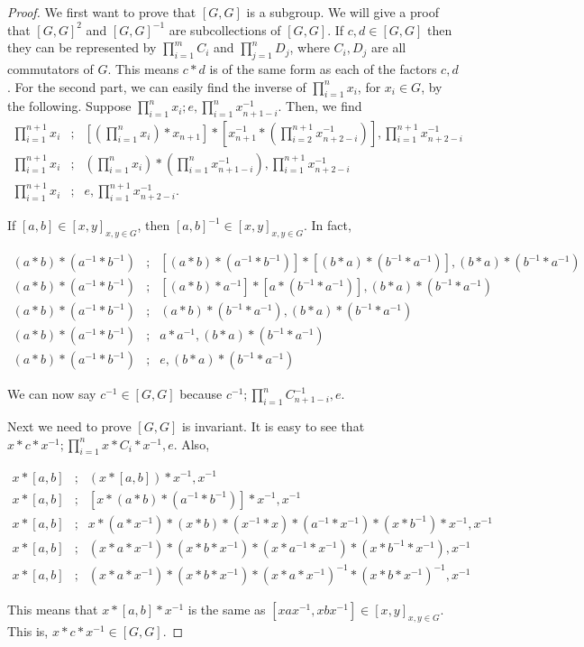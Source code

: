 \documentclass [12pt]{book}
\begin{document}
\begin{proof}We first want to prove that $[G,G]$ is a subgroup. We will give a proof that $[G,G]^2$ and $[G,G]^{-1}$ are subcollections of $[G,G]$. If $c,d\in [G,G]$ then they can be represented by $\prod_{i=1}^mC_{i}$ and $\prod_{j=1}^nD_j$, where $C_i,D_j$ are all commutators of $G$. This means $c*d$ is of the same form as each of the factors $c,d$. For the second part, we can easily find the inverse of $\prod_{i=1}^nx_i$, for $x_i\in G$, by the following. Suppose $\prod_{i=1}^nx_i;e,\prod_{i=1}^nx^{-1}_{n+1-i}$. Then, we find\begin{eqnarray}\nonumber\prod_{i=1}^{n+1}x_i&;&\left[\left(\prod_{i=1}^{n}x_i
\right)*x_{n+1}\right]*\left[x^{-1}_{n+1}*\left(\prod_{i=2}^{n+1}x_{n+2-i}^{-1}\right)\right],\prod_{i=1}^{n+1}x_{n+2-i}^{-1}\\\nonumber\prod_{i=1}^{n+1}x_i&;&\left(\prod_{i=1}^{n}x_i
\right)*\left(\prod_{i=1}^{n}x_{n+1-i}^{-1}\right),\prod_{i=1}^{n+1}x_{n+2-i}^{-1}\\\nonumber\prod_{i=1}^{n+1}x_i&;&e,\prod_{i=1}^{n+1}x_{n+2-i}^{-1}.\end{eqnarray}

If $[a,b]\in[x,y]_{x,y\in G}$, then $[a,b]^{-1}\in[x,y]_{x,y\in G}$. In fact,

\begin{eqnarray}\nonumber (a*b)*(a^{-1}*b^{-1})&;&[(a*b)*(a^{-1}*b^{-1})]*[(b*a)*(b^{-1}*a^{-1})],(b*a)*(b^{-1}*a^{-1})\\\nonumber (a*b)*(a^{-1}*b^{-1})&;&[(a*b)*a^{-1}]*[a*(b^{-1}*a^{-1})],(b*a)*(b^{-1}*a^{-1})\\\nonumber (a*b)*(a^{-1}*b^{-1})&;&(a*b)*(b^{-1}*a^{-1}),(b*a)*(b^{-1}*a^{-1})\\\nonumber (a*b)*(a^{-1}*b^{-1})&;&a*a^{-1},(b*a)*(b^{-1}*a^{-1})\\\nonumber (a*b)*(a^{-1}*b^{-1})&;&e,(b*a)*(b^{-1}*a^{-1})\end{eqnarray}

We can now say $c^{-1}\in[G,G]$
 because $c^{-1};\prod_{i=1}^nC^{-1}_{n+1-i},e$.

Next we need to prove $[G,G]$ is invariant. It is easy to see that $x*c*x^{-1};\prod_{i=1}^nx*C_i*x^{-1},e$. Also,

\begin{eqnarray}\nonumber x*[a,b]&;&(x*[a,b])*x^{-1},x^{-1}\\\nonumber x*[a,b]&;&[x*(a*b)*(a^{-1}*b^{-1})]*x^{-1},x^{-1}\\\nonumber x*[a,b]&;&x*(a*x^{-1})*(x*b)*(x^{-1}*x)*(a^{-1}*x^{-1})*(x*b^{-1})*x^{-1},x^{-1}
\\\nonumber x*[a,b]&;&(x*a*x^{-1})*(x*b*x^{-1})*(x*a^{-1}*x^{-1})*(x*b^{-1}*x^{-1}),x^{-1}
\\\nonumber x*[a,b]&;&(x*a*x^{-1})*(x*b*x^{-1})*(x*a*x^{-1})^{-1}*(x*b*x^{-1})^{-1},x^{-1}
\end{eqnarray}

This means that $x*[a,b]*x^{-1}$ is the same as $[xax^{-1},xbx^{-1}]\in[x,y]_{x,y\in G}$. This is, $x*c*x^{-1}\in[G,G]$.

\end{proof}
\end{document}
